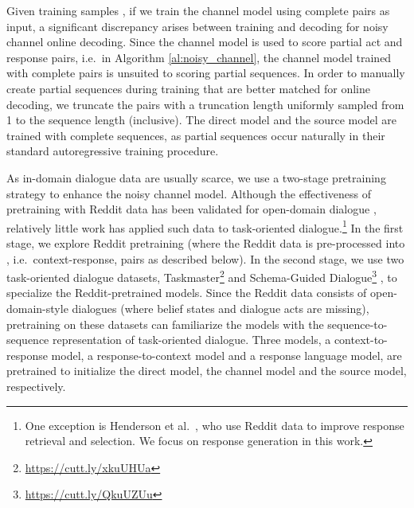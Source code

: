 \documentclass[11pt,a4paper]{article}
\begin{document}
Given training samples , if we train the channel model using complete  pairs as input, a significant discrepancy arises between training and decoding for noisy channel online decoding. Since the channel model is used to score partial act and response pairs, i.e.\  in Algorithm \ref{al:noisy_channel}, the channel model trained with complete  pairs is unsuited to scoring partial sequences.
In order to manually create partial sequences during training that are better matched for online decoding, we truncate the  pairs with a truncation length uniformly sampled from 1 to the sequence length (inclusive). The direct model and the source model are trained with complete sequences, as partial sequences occur naturally in their standard autoregressive training  procedure.



As in-domain dialogue data are usually scarce, we use a two-stage pretraining strategy to enhance the noisy channel model. Although the effectiveness of pretraining with Reddit data has been validated for open-domain dialogue \cite{zhang2019dialogpt,bao2019plato,adiwardana2020towards}, relatively little work has applied such data to task-oriented dialogue.\footnote{One exception is Henderson et al.\ , who use Reddit data to improve response retrieval and selection. We focus on response generation in this work.} In the first stage, we explore Reddit pretraining (where the Reddit data is pre-processed into , i.e.\ context-response, pairs as described below). In the second stage, we use two task-oriented dialogue datasets, Taskmaster\footnote{\url{https://cutt.ly/xkuUHUa}} \cite{byrne2019taskmaster} and Schema-Guided Dialogue\footnote{\url{https://cutt.ly/QkuUZUu}} \cite{rastogi2019towards}, to specialize the Reddit-pretrained models. Since the Reddit data consists of open-domain-style dialogues (where belief states and dialogue acts are missing), pretraining on these datasets can familiarize the models with the sequence-to-sequence representation of task-oriented dialogue. Three models, a context-to-response model, a response-to-context model and a response language model, are pretrained to initialize the direct model, the channel model and the source model, respectively.
\end{document}

